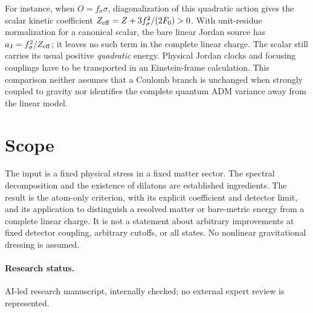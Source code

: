 \documentclass[11pt]{article}
\begin{document}
For instance, when \(O=f_\sigma\sigma\), diagonalization of this quadratic action gives the scalar kinetic coefficient \(Z_{\rm eff}=Z+3f_\sigma^2/(2F_0)>0\). With unit-residue normalization for a canonical scalar, the bare linear Jordan source has \(a_{\rm J}=f_\sigma^2/Z_{\rm eff}\); it leaves no such term in the complete linear charge. The scalar still carries its usual positive \emph{quadratic} energy. Physical Jordan clocks and focusing couplings have to be transported in an Einstein-frame calculation. This comparison neither assumes that a Coulomb branch is unchanged when strongly coupled to gravity nor identifies the complete quantum ADM variance away from the linear model.

\section{Scope}
The input is a fixed physical stress in a fixed matter sector. The spectral decomposition and the existence of dilatons are established ingredients. The result is the atom-only criterion, with its explicit coefficient and detector limit, and its application to distinguish a resolved matter or bare-metric energy from a complete linear charge. It is not a statement about arbitrary improvements at fixed detector coupling, arbitrary cutoffs, or all states. No nonlinear gravitational dressing is assumed.

\paragraph{Research status.} AI-led research manuscript, internally checked; no external expert review is represented.
\end{document}
